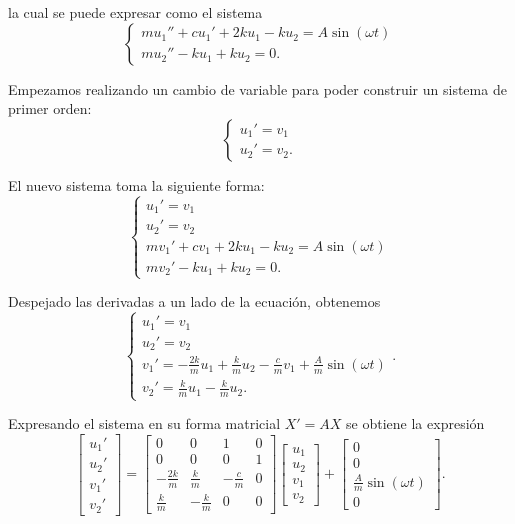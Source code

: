 la cual se puede expresar como el sistema
\[
	\begin{cases}
    	mu_1'' + cu_1' + 2ku_1 - ku_2 = A\sin(\omega t) \\
    	mu_2'' - ku_1 + ku_2 = 0
	.\end{cases}
\]

Empezamos realizando un cambio de variable para poder construir un sistema de primer orden:
\[
	\begin{cases}
    	u_1'=v_1 \\
    	u_2'=v_2.
	\end{cases}
\]

El nuevo sistema toma la siguiente forma:
\[
	\begin{cases}
    	u_1'=v_1 \\
    	u_2'=v_2 \\
    	mv_1' + cv_1 + 2ku_1 - ku_2 = A\sin(\omega t) \\
    	mv_2' - ku_1 + ku_2 = 0.
	\end{cases}
\]

Despejado las derivadas a un lado de la ecuación, obtenemos
\[
	\begin{cases}
    	u_1' = v_1 \\
    	u_2' = v_2 \\
    	v_1' = - \frac{2k}{m}u_1 + \frac{k}{m}u_2 - \frac{c}{m}v_1 + \frac{A}{m}\sin(\omega t) \\
    	v_2' = \frac{k}{m}u_1 - \frac{k}{m}u_2.
	\end{cases}
.\]

Expresando el sistema en su forma matricial \(X' = AX\) se obtiene la expresión
\[
    \begin{bmatrix} u_1' \\ u_2' \\ v_1' \\ v_2' \end{bmatrix} =
    \begin{bmatrix}
        0 & 0 & 1 & 0 \\
   	0 & 0 & 0 & 1 \\
    -\frac{2k}{m} & \frac{k}{m} & -\frac{c}{m} & 0 \\
    \frac{k}{m} & -\frac{k}{m} & 0 & 0
    \end{bmatrix} \begin{bmatrix} u_1 \\ u_2 \\ v_1 \\ v_2 \end{bmatrix}
    + \begin{bmatrix} 0 \\ 0 \\ \frac{A}{m}\sin(\omega t) \\ 0 \end{bmatrix}
.\]

